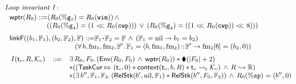 \begin{figure}[!t]
    \centering
    \[
        \small
        \begin{array}{l}
            \textit{Loop invariant I}: \\
            \\[-9pt] \ \ 
            \wptr(\RFile_0) \define 
            (\RFile_0(\greg{7}) = \RFile_0(\regwim)) \, \land \, \\
            \hspace*{6em} 
            ((\RFile_0(\greg{4}) = (1 <\!\!< \RFile_0(\regcwp))) \, \lor \, 
                (\RFile_0(\greg{4}) = ((1 <\!\!< \RFile_0(\regcwp)) <\!\!< 8))) \\
            \\[-5pt] \ \ 
            \linkF((\block_1, \hWstk_1), (\block_2, \hWstk_2), \hWstk) \define 
            \hWstk_1 \lstApp \hWstk_2 = \hWstk \, \land \, 
            (\hWstk_1 = \nil \rightarrow \block_1 = \block_2) \\
            \hspace*{10em}
            (\forall \, \block, \fm_1, \fm_2, \hWstk'. \, 
                \hWstk_1 = (\block, \fm_1, \fm_2) \stCons \hWstk' \rightarrow
                \fm_2[6] = (\block_2, 0)
            )
            \\
            \\[-5pt]
            \begin{array}{lcl} \ 
                I(\thrdid_c, \RFile, \hthrdlocalst_c) & \define & 
                \exists \, \RFile_0, \Wstack_0. \, 
                (\Env{\RFile_0, \Wstack_0} \, \land \, 
                \wptr(\RFile_0)) \sepstar 
                \metricAst{|\Wstack_0| + 2} \\
                & & 
                \sepstar
                (
                (
                    \relmsto{\TaskCur}{(\thrdid_c, 0)} \sepstar 
                    \relcontext{\thrdid_c}{\block}{\RFile} \sepstar 
                    \astCurCont{\thrdid_c}{\hthrdlocalst_c}
                ) 
                \, \land \, \Rinj{\RFile}{\hRfile}) \\
                & & \sepstar
                (
                    \exists \, \block'', \hWstk_1, \hWstk_2. \, 
                    (\RelStk{\block'}{\nil}{\hWstk_1} \sepstar 
                        \RelStk{\block''}{\Wstack_0}{\hWstk_2}) \,
                    \land \, 
                    \RFile_0(\spreg) = (\block'', 0) \\

\end{array}
\end{array}\]
\end{figure}
